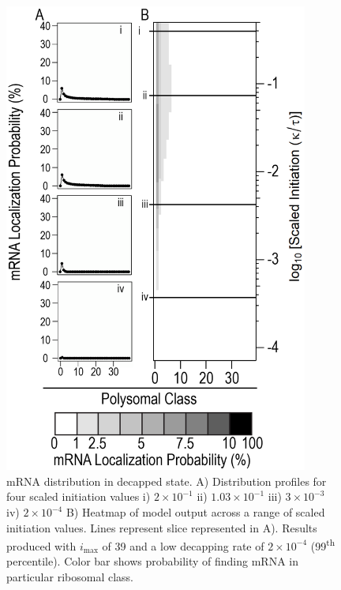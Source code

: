 \documentclass[review]{elsarticle}
\newcommand{\imax}{\ensuremath{{i_{\max}}}\xspace}
\begin{document}
\begin{enumerate}
\begin{enumerate}
\begin{figure}[!ht]
\centering
\includegraphics[width=100mm]{Images/2023-07-04_Marked_slices.png}
\caption{mRNA distribution in decapped state. A) Distribution profiles for four scaled initiation values i) $2\times 10^{-1}$ ii) $1.03\times 10^{-1}$ iii) $3\times 10^{-3}$ iv) $2\times 10^{-4}$ B) Heatmap of model output across a range of scaled initiation values. Lines represent slice represented in A). Results produced with \imax of 39 and a low decapping rate of $2\times10^{-4}$  (99\textsuperscript{th} percentile). Color bar shows probability of finding mRNA in particular ribosomal class.}
\end{figure}
\clearpage


\end{enumerate}
\end{enumerate}
\end{document}
